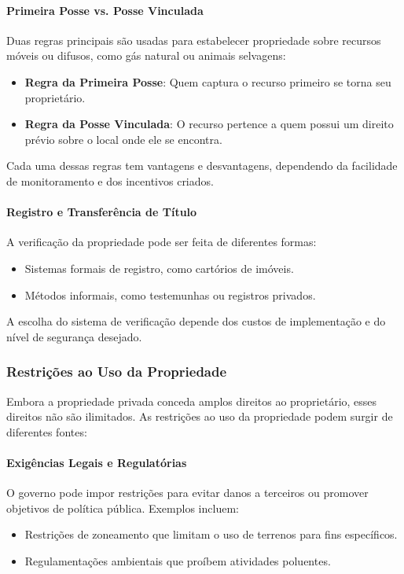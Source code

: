 \documentclass[a4paper,12pt]{article}[abntex2]
\begin{document}
\paragraph{Primeira Posse vs. Posse Vinculada}
Duas regras principais são usadas para estabelecer propriedade sobre recursos móveis ou difusos, como gás natural ou animais selvagens:
\begin{itemize}
    \item \textbf{Regra da Primeira Posse}: Quem captura o recurso primeiro se torna seu proprietário.
    \item \textbf{Regra da Posse Vinculada}: O recurso pertence a quem possui um direito prévio sobre o local onde ele se encontra.
\end{itemize}

Cada uma dessas regras tem vantagens e desvantagens, dependendo da facilidade de monitoramento e dos incentivos criados.

\paragraph{Registro e Transferência de Título}
A verificação da propriedade pode ser feita de diferentes formas:
\begin{itemize}
    \item Sistemas formais de registro, como cartórios de imóveis.
    \item Métodos informais, como testemunhas ou registros privados.
\end{itemize}

A escolha do sistema de verificação depende dos custos de implementação e do nível de segurança desejado.

\subsubsection{Restrições ao Uso da Propriedade}
Embora a propriedade privada conceda amplos direitos ao proprietário, esses direitos não são ilimitados. As restrições ao uso da propriedade podem surgir de diferentes fontes:

\paragraph{Exigências Legais e Regulatórias}
O governo pode impor restrições para evitar danos a terceiros ou promover objetivos de política pública. Exemplos incluem:
\begin{itemize}
    \item Restrições de zoneamento que limitam o uso de terrenos para fins específicos.
    \item Regulamentações ambientais que proíbem atividades poluentes.
\end{itemize}
\end{document}
